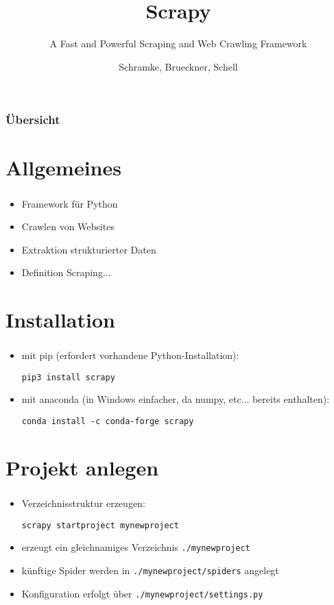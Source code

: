 \documentclass{beamer}
\title{Scrapy}
\subtitle{A Fast and Powerful Scraping and Web Crawling Framework}
\author{Schramke, Brueckner, Schell}
\begin{document}
\frame{\titlepage}
\begin{frame}
	\frametitle{Übersicht}
	\tableofcontents
\end{frame}
\section{Allgemeines}
\begin{frame}
	\frametitle{\insertsection}
	\begin{itemize}
		\item  Framework für Python
		\item  Crawlen von Websites
		\item  Extraktion strukturierter Daten
		\item  Definition Scraping...
	\end{itemize} 
\end{frame}

\section{Installation}
\begin{frame}[fragile]
	\frametitle{\insertsection}
	\begin{itemize}
		\item mit pip (erfordert vorhandene Python-Installation):
			\begin{lstlisting}
pip3 install scrapy
			\end{lstlisting}
		\item mit anaconda (in Windows einfacher, da numpy, etc... bereits enthalten):
			\begin{lstlisting}
conda install -c conda-forge scrapy
			\end{lstlisting}
	\end{itemize}
\end{frame}

\section{Projekt anlegen}
\begin{frame}[fragile]
	\frametitle{\insertsection}
	\begin{itemize}
		\item Verzeichnisstruktur erzeugen:
			\begin{lstlisting}
scrapy startproject mynewproject
			\end{lstlisting}
		\item erzeugt ein gleichnamiges Verzeichnis \verb|./mynewproject| 
		\item künftige Spider werden in \verb|./mynewproject/spiders| angelegt
		\item Konfiguration erfolgt über \verb|./mynewproject/settings.py|
	\end{itemize}
\end{frame}
\end{document}
